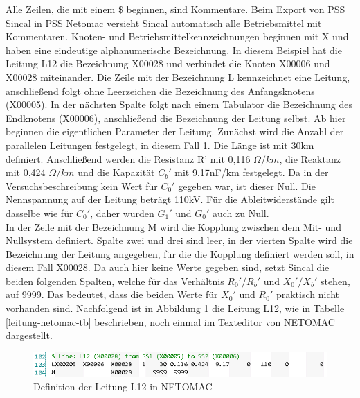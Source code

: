 \documentclass{scrartcl}
\begin{document}
\begin{onehalfspace}
Alle Zeilen, die mit einem \$ beginnen, sind Kommentare. Beim Export von PSS Sincal in PSS Netomac versieht Sincal automatisch alle Betriebsmittel mit Kommentaren. Knoten- und Betriebsmittelkennzeichnungen beginnen mit X und haben eine eindeutige alphanumerische Bezeichnung. In diesem Beispiel hat die Leitung L12 die Bezeichnung X00028 und verbindet die Knoten X00006 und X00028 miteinander. Die Zeile mit der Bezeichnung L kennzeichnet eine Leitung, anschließend folgt ohne Leerzeichen die Bezeichnung des Anfangsknotens (X00005). In der nächsten Spalte folgt nach einem Tabulator die Bezeichnung des Endknotens (X00006), anschließend die Bezeichnung der Leitung selbst. Ab hier beginnen die eigentlichen Parameter der Leitung. Zunächst wird die Anzahl der parallelen Leitungen festgelegt, in diesem Fall 1. Die Länge ist mit 30km definiert. Anschließend werden die Resistanz R' mit 0,116 $\Omega /km$, die Reaktanz mit 0,424 $\Omega /km$ und die Kapazität $C_b'$ mit 9,17nF/km festgelegt. Da in der Versuchsbeschreibung kein Wert für $C_0'$ gegeben war, ist dieser Null. Die Nennspannung auf der Leitung beträgt 110kV. Für die Ableitwiderstände gilt dasselbe wie für $C_0'$, daher wurden $G_1'$ und $G_0'$ auch zu Null.\\
In der Zeile mit der Bezeichnung M wird die Kopplung zwischen dem Mit- und Nullsystem definiert. Spalte zwei und drei sind leer, in der vierten Spalte wird die Bezeichnung der Leitung angegeben, für die die Kopplung definiert werden soll, in diesem Fall X00028. Da auch hier keine Werte gegeben sind, setzt Sincal die beiden folgenden Spalten, welche für das Verhältnis $R_0'/R_b'$ und $X_0'/X_b'$ stehen, auf 9999. Das bedeutet, dass die beiden Werte für $X_0'$ und $R_0'$ praktisch nicht vorhanden sind. Nachfolgend ist in Abbildung \ref{leitung-netomac} die Leitung L12, wie in Tabelle \ref{leitung-netomac-tb} beschrieben, noch einmal im Texteditor von NETOMAC dargestellt.

	\begin{figure}[H]
	\centering
	\includegraphics[scale=0.75]{img/netomac-l12.png}
	\caption{Definition der Leitung L12 in NETOMAC}
	\label{leitung-netomac}
	\end{figure}
	

\end{onehalfspace}
\end{document}
